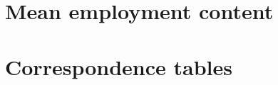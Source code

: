 \documentclass[12pt,english]{article}
\begin{document}
%
%
%
%
%




\clearpage

\newpage


\clearpage

\appendix

\section{Mean employment content} \label{ECmean}


\section{Correspondence tables}
\end{document}
